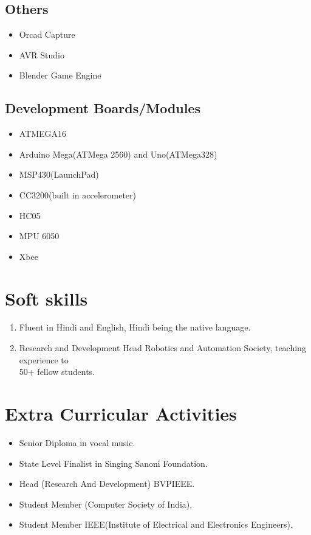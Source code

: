 \documentclass[11pt]{article}
\begin{document}
\begin{minipage}{1.5\linewidth}
\subsection{Others}
\begin{itemize}
\item Orcad Capture
\item AVR Studio
\item Blender Game Engine
\end{itemize}
\end{minipage}

\begin{minipage}{1.5\linewidth}
\subsection{Development Boards/Modules}
\begin{itemize}
\item ATMEGA16
\item Arduino Mega(ATMega 2560) and Uno(ATMega328)
\item MSP430(LaunchPad)
\item CC3200(built in accelerometer)
\item HC05
\item MPU 6050
\item Xbee
\end{itemize}

\section{\color{orange}Sof\color{black}t skills}
\begin{enumerate}
\item Fluent in Hindi and English, Hindi being the native language.
\item Research and Development Head Robotics and Automation Society, teaching experience to \\50+ fellow students.
\end{enumerate}

\section{\color{red}Ext\color{black}ra Curricular Activities}
\begin{itemize}
\item Senior Diploma in vocal music.
\item State Level Finalist in Singing Sanoni Foundation.
\item Head (Research And Development) BVPIEEE.
\item Student Member (Computer Society of India).
\item Student Member IEEE(Institute of Electrical and Electronics Engineers).
\end{itemize}



\end{minipage}
\end{document}
